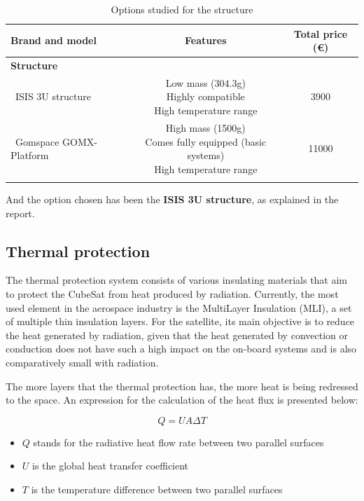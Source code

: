 \begin{longtable}{| l | c | c | }
\hline
\rowcolor[gray]{0.80}	\textbf{Brand and model} &  \textbf{Features}     & \textbf{Total price (\euro)}   \\
\hline
\endfirsthead

\rowcolor[gray]{0.85} \textbf{Structure} &  &  \\
	   ~ISIS 3U structure & \makecell{Low mass (304.3g) \\ Highly compatible \\ High temperature range} & 3900 \\
	   \hline
	   ~Gomspace GOMX-Platform & \makecell{High mass (1500g) \\ Comes fully equipped (basic systems) \\ High temperature range} & 11000 \\
	   \hline
\caption{Options studied for the structure}
\label{structureoptions}
\end{longtable}

And the option chosen has been the \textbf{ISIS 3U structure}, as explained in the report.

\subsection{Thermal protection}
The thermal protection system consists of various insulating materials that aim to protect the CubeSat from heat produced by radiation. Currently, the most used element in the aerospace industry is the MultiLayer Insulation (MLI), a set of multiple thin insulation layers. For the satellite, its main objective is to reduce the heat generated by radiation, given that the heat generated by convection or conduction does not have such a high impact on the on-board systems and is also comparatively small with radiation. 

The more layers that the thermal protection has, the more heat is being redressed to the space. An expression for the calculation of the heat flux is presented below:

\begin{equation}
Q=UA\Delta T
\label{eqheatbasic}
\end{equation}

\begin{itemize}
\item $Q$ stands for the radiative heat flow rate between two parallel surfaces
\item $U$ is the global heat transfer coefficient
\item $T$ is the temperature difference between two parallel surfaces
\end{itemize}

